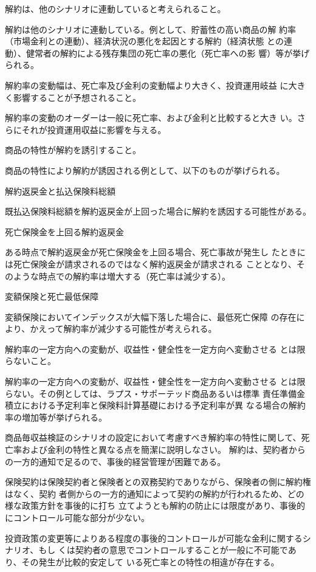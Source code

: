 \documentclass[report,gutter=10mm,fore-edge=10mm,uplatex,dvipdfmx]{jlreq}
\begin{document}
解約は、他のシナリオに連動していると考えられること。

解約は他のシナリオに連動している。例として、貯蓄性の高い商品の解
約率（市場金利との連動）、経済状況の悪化を起因とする解約（経済状態
との連動）、健常者の解約による残存集団の死亡率の悪化（死亡率への影
響）等が挙げられる。

解約率の変動幅は、死亡率及び金利の変動幅より大きく、投資運用岐益
に大きく影響することが予想されること。

解約率の変動のオーダーは一般に死亡率、および金利と比較すると大き
い。さらにそれが投資運用収益に影響を与える。

商品の特性が解約を誘引すること。

商品の特性により解約が誘因される例として、以下のものが挙げられる。

解約返戻金と払込保険料総額

既払込保険料総額を解約返戻金が上回った場合に解約を誘因する可能性がある。

死亡保険金を上回る解約返戻金

ある時点で解約返戻金が死亡保険金を上回る場合、死亡事故が発生し
たときには死亡保険金が請求されるのではなく解約返戻金が請求される
こととなり、そのような時点での解約率は増大する（死亡率は減少する）。

変額保険と死亡最低保障

変額保険においてインデックスが大幅下落した場合に、最低死亡保障
の存在により、かえって解約率が減少する可能性が考えられる。


解約率の一定方向への変動が、収益性・健全性を一定方向へ変動させる
とは限らないこと。

解約率の一定方向への変動が、収益性・健全性を一定方向へ変動させる
とは限らない。その例としては、ラプス・サポーテッド商品あるいは標準
責任準備金積立における予定利率と保険料計算基礎における予定利率が異
なる場合の解約率の増加等が挙げられる。

商品毎収益検証のシナリオの設定において考慮すべき解約率の特性に関して、死亡率および金利の特性と異なる点を簡潔に説明しなさい。
\answer{}
解約は、契約者からの一方的通知で足るので、事後的経営管理が困難である。

保険契約は保険契約者と保険者との双務契約でありながら、保険者の側に解約権はなく、契約
者側からの一方的通知によって契約の解約が行われるため、どの様な政策方針を事後的に打ち
立てようとも解約の防止には限度があり、事後的にコントロール可能な部分が少ない。

投資政策の変更等によりある程度の事後的コントロールが可能な金利に関するシナリオ、もし
くは契約者の意思でコントロールすることが一般に不可能であり、その発生が比較的安定して
いる死亡率との特性の相違が存在する。
\end{document}
